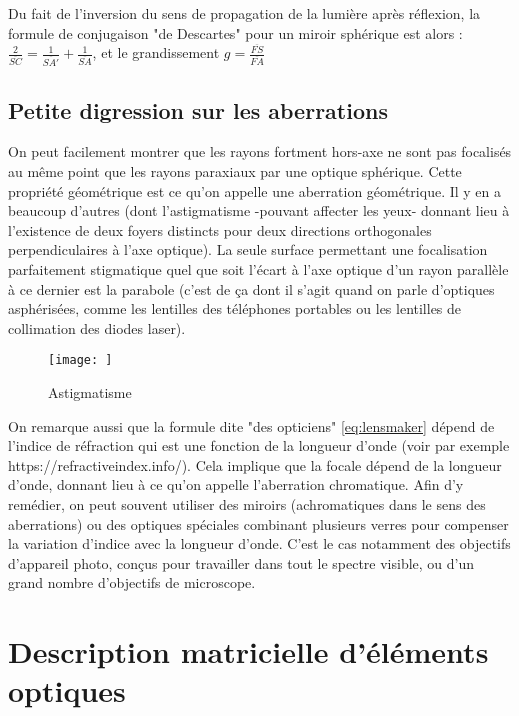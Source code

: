 \documentclass[a4paper]{article}
\begin{document}
Du fait de l'inversion du sens de propagation de la lumière après réflexion, la formule de conjugaison "de Descartes" pour un miroir sphérique est alors : $\frac{2}{\overline{SC}}=\frac{1}{\overline{SA'}}+\frac{1}{\overline{SA}}$, et le grandissement $g = \frac{\overline{FS}}{\overline{FA}}$

\subsection{Petite digression sur les aberrations}

On peut facilement montrer que les rayons fortment hors-axe ne sont pas focalisés au même point que les rayons paraxiaux par une optique sphérique. Cette propriété géométrique est ce qu'on appelle une aberration géométrique. Il y en a beaucoup d'autres (dont l'astigmatisme -pouvant affecter les yeux- donnant lieu à l'existence de deux foyers distincts pour deux directions orthogonales perpendiculaires à l'axe optique). La seule surface permettant une focalisation parfaitement stigmatique quel que soit l'écart à l'axe optique d'un rayon parallèle à ce dernier est la parabole (c'est de ça dont il s'agit quand on parle d'optiques asphérisées, comme les lentilles des téléphones portables ou les lentilles de collimation des diodes laser).

\begin{figure}[!htbp]
\label{fig:astig}
\begin{center}
\texttt{[image: ]}
\end{center}
\caption{Astigmatisme}
\end{figure}
On remarque aussi que la formule dite "des opticiens" \ref{eq:lensmaker} dépend de l'indice de réfraction qui est une fonction de la longueur d'onde (voir par exemple https://refractiveindex.info/). Cela implique que la focale dépend de la longueur d'onde, donnant lieu à ce qu'on appelle l'aberration chromatique. Afin d'y remédier, on peut souvent utiliser des miroirs (achromatiques dans le sens des aberrations) ou des optiques spéciales combinant plusieurs verres pour compenser la variation d'indice avec la longueur d'onde. C'est le cas notamment des objectifs d'appareil photo, conçus pour travailler dans tout le spectre visible, ou d'un grand nombre d'objectifs de microscope. 

\section{Description matricielle d'éléments optiques}
\end{document}
